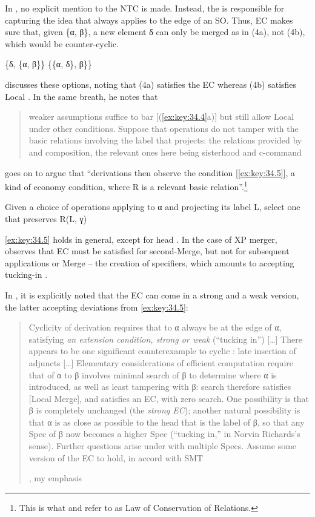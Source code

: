 \documentclass[output=paper]{langsci/langscibook}
\begin{document}
In \citet{Chomsky2000,Chomsky2001,Chomsky2004,Chomsky2005}, no explicit mention
to the \gls{NTC} is made. Instead, the \textsc{} is responsible
for capturing the idea that  always applies to the edge of an \gls{SO}.
Thus, \gls{EC} makes sure that, given \{α, β\}, a new element δ can only be
merged as in (4a), not (4b), which would be counter-cyclic.

\ea%
    \label{ex:key:34.4}
	\ea \{δ, \{α, β\}\}
	\ex \{\{α, δ\}, β\}\}
	\z
\z

\citet[136]{Chomsky2000} discusses these options, noting that (4a) satisfies
the \gls{EC} whereas (4b) satisfies Local . In the same breath, he
notes that \blockquote[{\citealt[136]{Chomsky2000}}][.]{weaker assumptions
    suffice to bar [(\ref{ex:key:34.4}a)] but still allow Local 
    under other conditions.  Suppose that operations do not tamper with the
    basic relations involving the label that projects: the relations provided
    by  and composition, the relevant ones here being sisterhood and
    c-command} \citet[137]{Chomsky2000} goes on to argue that
    \enquote{derivations then observe the condition [\eqref{ex:key:34.5}], a
        kind of economy condition, where R is a relevant basic
    relation}.\footnote{This is what \citet[Ch.\ 2]{LasUri2005} and
\citet[256]{EKS2012} refer to as Law of Conservation of Relations.}

\ea%
    \label{ex:key:34.5} Given a choice of operations applying to α and
    projecting its label L, select one that preserves R(L, γ)
\z

\eqref{ex:key:34.5} holds in general, except for head . In the case of XP merger,
\citet{Chomsky2000} observes that \gls{EC} must be satisfied for second-Merge, but
not for subsequent applications or Merge -- the creation of specifiers, which
amounts to accepting tucking-in \citep{Richards1997}.

In \citet{Chomsky2004}, it is explicitly noted that the \gls{EC} can come in a
strong and a weak version, the latter accepting deviations from
\eqref{ex:key:34.5}:

\blockquote[{\citealt[109]{Chomsky2004}, my emphasis}][.]{%
Cyclicity of derivation requires that  to α always be at the edge
of α, satisfying \emph{an extension condition, strong or weak}
(“tucking in”) [\dots{}] There appears to be one significant counterexample to
cyclic : late insertion of adjuncts [\dots{}] Elementary considerations of
efficient computation require that  of α to β involves
minimal search of β to determine where α is introduced, as
well as least tampering with β: search therefore satisfies [Local
Merge], and  satisfies an \gls{EC}, with zero search. One possibility is
that β is completely unchanged (the \emph{strong \gls{EC}}); another natural
possibility is that α is as close as possible to the head that is the label of
β, so that any Spec of β now becomes a higher Spec (“tucking in,” in Norvin
Richards’s sense). Further questions arise under  with multiple Specs.
Assume some version of the \gls{EC} to hold, in accord with
\gls{SMT}}
\end{document}
